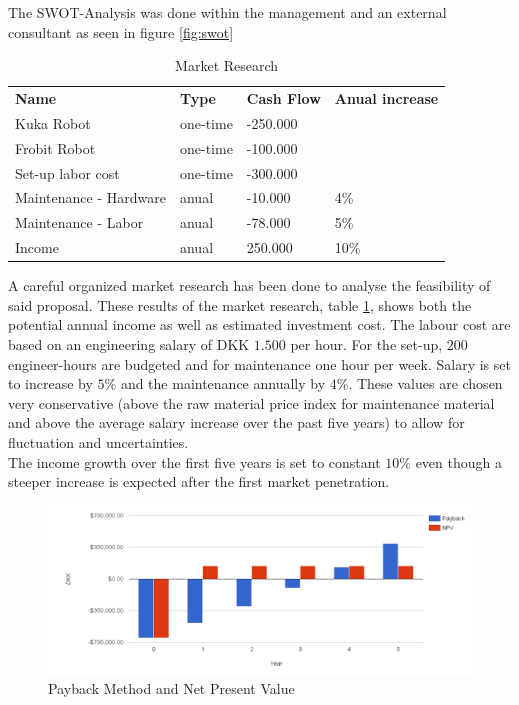 The SWOT-Analysis was done within the management and an external consultant as seen in figure \ref{fig:swot}
\begin{table}[]
\centering
\begin{tabular}{llll}
\textbf{Name}          & \textbf{Type} & \textbf{Cash Flow} & \textbf{Anual increase} \\
Kuka Robot             & one-time      & -250.000           &                         \\
Frobit Robot           & one-time      & -100.000           &                         \\
Set-up labor cost      & one-time      & -300.000           &                         \\
Maintenance - Hardware & anual         & -10.000            & 4\%                     \\
Maintenance - Labor    & anual         & -78.000            & 5\%                     \\
Income                 & anual         & 250.000            & 10\%                   
\end{tabular}
\caption{Market Research}
\label{tab:market_research}
\end{table}
A careful organized market research has been done to analyse the feasibility of said proposal. These results of the market research, table \ref{tab:market_research}, shows both the potential annual income as well as estimated investment cost.
The labour cost are based on an engineering salary of DKK $1.500$ per hour. For the set-up, $200$ engineer-hours are budgeted and for maintenance one hour per week. Salary is set to increase by $5\%$ and the maintenance annually by $4\%$. These values are chosen very conservative (above the raw material price index for maintenance material and above the average salary increase over the past five years) to allow for fluctuation and uncertainties. \\ 
The income growth over the first five years is set to constant $10\%$ even though a steeper increase is expected after the first market penetration.\\
    \begin{figure}[h]
        \centering
        \includegraphics[width=1.0\textwidth]{figs/pb_npv}
        \caption{Payback Method and Net Present Value}
        \label{fig:payback_npv}
    \end{figure}


